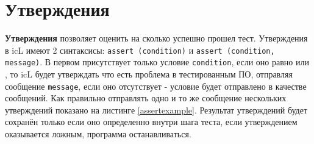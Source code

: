 \section{Утверждения}

{\bf Утверждения} позволяет оценить на сколько успешно прошел тест. Утверждения в icL имеют 2 синтаксисы: \texttt{assert (condition)} и \texttt{assert (condition, message)}. В первом присутствует только условие \texttt{condition}, если оно равно \false{} или \void, то icL будет утверждать что есть проблема в тестированным ПО, отправляя сообщение \texttt{message}, если оно отсутствует - условие будет отправлено в качестве сообщений. Как правильно отправлять одно и то же сообщение нескольких утверждений показано на листинге \ref{assertexample}. Результат утверждений будет сохранён только если оно определенно внутри шага теста, если утверждением оказывается ложным, программа останавливаться.

\begin{sourcecode}
	\label{assertexample}
    \inputminted[linenos]{icl}{../sources/assertexample.icL}
\end{sourcecode}


